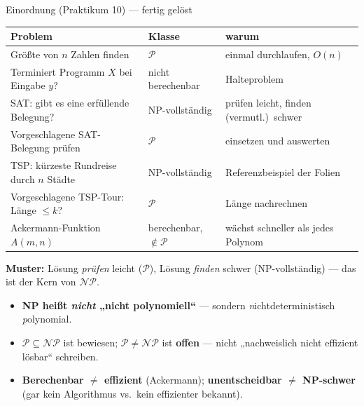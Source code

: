 \documentclass[10pt,a4paper]{article}
\begin{document}
\begin{defbox}{Einordnung (Praktikum 10) — fertig gelöst}
\renewcommand{\arraystretch}{1.15}\small
\begin{tabular}{@{}p{6.6cm}p{3.4cm}p{6.2cm}@{}}
\textbf{Problem} & \textbf{Klasse} & \textbf{warum} \\
\hline
Größte von $n$ Zahlen finden & $\mathcal{P}$ & einmal durchlaufen, $O(n)$ \\
Terminiert Programm $X$ bei Eingabe $y$? & nicht berechenbar & Halteproblem \\
SAT: gibt es eine erfüllende Belegung? & NP-vollständig & prüfen leicht, finden (vermutl.)\ schwer \\
Vorgeschlagene SAT-Belegung prüfen & $\mathcal{P}$ & einsetzen und auswerten \\
TSP: kürzeste Rundreise durch $n$ Städte & NP-vollständig & Referenzbeispiel der Folien \\
Vorgeschlagene TSP-Tour: Länge $\le k$? & $\mathcal{P}$ & Länge nachrechnen \\
Ackermann-Funktion $A(m,n)$ & berechenbar, $\notin \mathcal{P}$ & wächst schneller als jedes Polynom \\
\end{tabular}
\par\vspace{1pt}
\textbf{Muster:} Lösung \emph{prüfen} leicht ($\mathcal{P}$), Lösung \emph{finden} schwer
(NP-vollständig) — das ist der Kern von $\mathcal{NP}$.
\end{defbox}

\begin{fallenbox}
\small\begin{itemize}
  \item \textbf{NP heißt \emph{nicht} „nicht polynomiell``} — sondern
        \emph{n}ichtdeterministisch \emph{p}olynomial.
  \item $\mathcal{P} \subseteq \mathcal{NP}$ ist bewiesen; $\mathcal{P} \neq \mathcal{NP}$ ist
        \textbf{offen} — nicht „nachweislich nicht effizient lösbar`` schreiben.
  \item \textbf{Berechenbar $\neq$ effizient} (Ackermann); \textbf{unentscheidbar $\neq$
        NP-schwer} (gar kein Algorithmus vs.\ kein effizienter bekannt).
\end{itemize}
\end{fallenbox}
\end{document}
